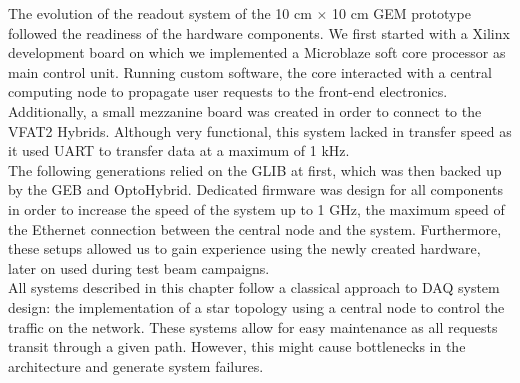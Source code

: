     The evolution of the readout system of the 10 cm $ \times $ 10 cm GEM prototype followed the readiness of the hardware components. We first started with a Xilinx development board on which we implemented a Microblaze soft core processor as main control unit. Running custom software, the core interacted with a central computing node to propagate user requests to the front-end electronics. Additionally, a small mezzanine board was created in order to connect to the VFAT2 Hybrids. Although very functional, this system lacked in transfer speed as it used UART to transfer data at a maximum of 1 kHz. \\

    The following generations relied on the GLIB at first, which was then backed up by the GEB and OptoHybrid. Dedicated firmware was design for all components in order to increase the speed of the system up to 1 GHz, the maximum speed of the Ethernet connection between the central node and the system. Furthermore, these setups allowed us to gain experience using the newly created hardware, later on used during test beam campaigns. \\

    All systems described in this chapter follow a classical approach to DAQ system design: the implementation of a star topology using a central node to control the traffic on the network. These systems allow for easy maintenance as all requests transit through a given path. However, this might cause bottlenecks in the architecture and generate system failures.

